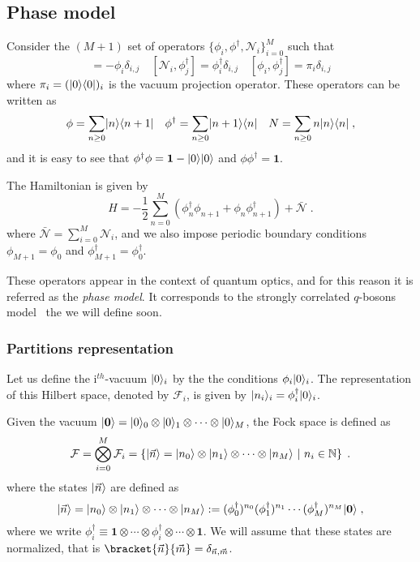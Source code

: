 \documentclass[a4paper,11pt]{amsart}
\begin{document}
\subsection{Phase model}
Consider the \((M+1)\) set of operators \(\{\phi_i,
\phi^\dagger,\mathcal{N}_i\}_{i=0}^M\) such that
\begin{equation}
 [\mathcal{N}_i, \phi_j] = - \phi_i \delta_{i,j} \quad
 [\mathcal{N}_i, \phi_j^\dagger] =  \phi_i^\dagger \delta_{i,j}  \quad 
 [\phi_i, \phi_j^\dagger] =  \pi_i \delta_{i,j}  
\end{equation}
where \(\pi_i =(\lvert0\rangle \langle0\rvert)_i\) is the vacuum projection operator.
These operators can be written as
\begin{equation}
\phi = \sum_{n\geq 0}\lvert n\rangle\langle n+1\rvert\quad 
\phi^\dagger = \sum_{n\geq 0}\lvert n+1\rangle\langle n\rvert \quad 
N = \sum_{n\geq 0}n\lvert n\rangle\langle n\rvert\; ,
\end{equation}
and it is easy to see that \(\phi^\dagger \phi = \bm{1} - \lvert0\rangle
\lvert0\rangle\) and \(\phi\phi^\dagger = \bm{1}\).

The Hamiltonian is given by
\begin{equation}
  H = - \frac{1}{2} \sum_{n =0}^M \left(\phi_n^\dagger \phi_{n+1}
  + \phi_n \phi_{n+1}^\dagger \right) + \bar{\mathcal{N}}\; .
\end{equation}
where \(\bar{\mathcal{N}} = \sum_{i=0}^M \mathcal{N}_i\), and we also
impose periodic boundary conditions \(\phi_{M+1} = \phi_0\) and
\(\phi_{M+1}^\dagger = \phi_0^\dagger\).

These operators appear in the context of quantum optics, and for
this reason it is referred as the \emph{phase model}. It 
corresponds to the strongly correlated \(q\)-bosons
model~\cite{Bogoliubov:1997soj} the we will define soon.

\subsubsection{Partitions representation}
Let us define the i\(^{th}\)-vacuum \(\lvert0\rangle_i\) by the the conditions 
\(\phi_i\lvert0\rangle_i\). The representation of this Hilbert space, denoted by
\(\mathcal{F}_i\), is given by \(\lvert n_i\rangle_i = \phi_i^\dagger \lvert0\rangle_i\). 

Given the vacuum \(\lvert\bm{0}\rangle = \lvert0\rangle_0\otimes \lvert0\rangle_1
\otimes \cdots \otimes  \lvert0\rangle_M\),
the Fock space is defined as 
\begin{equation}
  \mathcal{F} = \bigotimes_{i=0}^M \mathcal{F}_i = 
  \left\{\lvert\vec{n}\rangle = \lvert n_0\rangle\otimes \lvert n_1\rangle \otimes \cdots
  \otimes \lvert n_M\rangle \ | \ n_i \in \mathbb{N} \right\}\; .
\end{equation}
where the states \(\lvert\vec{n}\rangle\) are defined as 
\begin{equation}
  \lvert\vec{n}\rangle = \lvert n_0\rangle\otimes \lvert n_1\rangle \otimes \cdots \otimes \lvert n_M\rangle 
 : =  (\phi_0^\dagger)^{n_0} (\phi_1^\dagger)^{n_1} \cdots  (\phi_M^\dagger)^{n_M} \lvert\bm{0}\rangle \; ,
\end{equation}
where we write \(\phi_i^\dagger \equiv \bm{1} \otimes  \cdots \otimes
\phi_i^\dagger \otimes \cdots \otimes \bm{1}\).
We will assume that these states are normalized, that is
\(\bracket{\vec{n}}{\vec{m}}=\delta_{\vec{n}, \vec{m}}\). 
\end{document}
